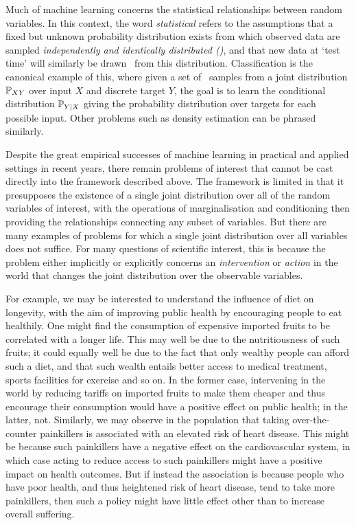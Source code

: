 Much of machine learning concerns the statistical relationships between random variables. In this context, the word \emph{statistical} refers to the assumptions that a fixed but unknown probability distribution exists from which observed data are sampled \emph{independently and identically distributed (\iid)}, and that new data at `test time' will similarly be drawn \iid~from this distribution.
Classification is the canonical example of this, where given a set of \iid~samples from a joint distribution $\mathbb{P}_{XY}$ over input $X$ and discrete target $Y$, the goal is to learn the conditional distribution $\mathbb{P}_{Y|X}$ giving the probability distribution over targets for each possible input. Other problems such as density estimation can be phrased similarly.

Despite the great empirical successes of machine learning in practical and applied settings in recent years, there remain problems of interest that cannot be cast directly into the framework described above. 
The framework is limited in that it presupposes the existence of a single joint distribution over all of the random variables of interest, with the operations of marginalisation and conditioning then providing the relationships connecting any subset of variables.
But there are many examples of problems for which a single joint distribution over all variables does not suffice. 
For many questions of scientific interest, this is because the problem either implicitly or explicitly concerns an \emph{intervention} or \emph{action} in the world that changes the joint distribution over the observable variables.

For example, we may be interested to understand the influence of diet on longevity, with the aim of improving public health by encouraging people to eat healthily. 
One might find the consumption of expensive imported fruits to be correlated with a longer life. This may well be due to the nutritiousness of such fruits; it could equally well be due to the fact that only wealthy people can afford such a diet, and that such wealth entails better access to medical treatment, sports facilities for exercise and so on. In the former case, intervening in the world by reducing tariffs on imported fruits to make them cheaper and thus encourage their consumption would have a positive effect on public health; in the latter, not.
Similarly, we may observe in the population that taking over-the-counter painkillers is associated with an elevated risk of heart disease. This might be because such painkillers have a negative effect on the cardiovascular system, in which case acting to reduce access to such painkillers might have a positive impact on health outcomes. But if instead the association is because people who have poor health, and thus heightened risk of heart disease, tend to take more painkillers, then such a policy might have little effect other than to increase overall suffering.

